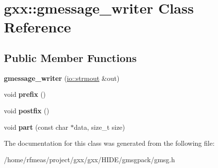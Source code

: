 \hypertarget{classgxx_1_1gmessage__writer}{}\section{gxx\+:\+:gmessage\+\_\+writer Class Reference}
\label{classgxx_1_1gmessage__writer}
\subsection*{Public Member Functions}
\begin{DoxyCompactItemize}
\item 
{\bfseries gmessage\+\_\+writer} (\hyperlink{classgxx_1_1io_1_1strmout}{io\+::strmout} \&out)\hypertarget{classgxx_1_1gmessage__writer_a503a7a90f345d0a882e3da00b2a755d9}{}\label{classgxx_1_1gmessage__writer_a503a7a90f345d0a882e3da00b2a755d9}

\item 
void {\bfseries prefix} ()\hypertarget{classgxx_1_1gmessage__writer_a2e51aa04f7a579094ee8ee5a0b62e291}{}\label{classgxx_1_1gmessage__writer_a2e51aa04f7a579094ee8ee5a0b62e291}

\item 
void {\bfseries postfix} ()\hypertarget{classgxx_1_1gmessage__writer_a52d8dea315e46eb624f123ca8ae6a6f0}{}\label{classgxx_1_1gmessage__writer_a52d8dea315e46eb624f123ca8ae6a6f0}

\item 
void {\bfseries part} (const char $\ast$data, size\+\_\+t size)\hypertarget{classgxx_1_1gmessage__writer_a23459e5070d024813118f563747f55fb}{}\label{classgxx_1_1gmessage__writer_a23459e5070d024813118f563747f55fb}

\end{DoxyCompactItemize}


The documentation for this class was generated from the following file\+:\begin{DoxyCompactItemize}
\item 
/home/rfmeas/project/gxx/gxx/\+H\+I\+D\+E/gmsgpack/gmsg.\+h\end{DoxyCompactItemize}
